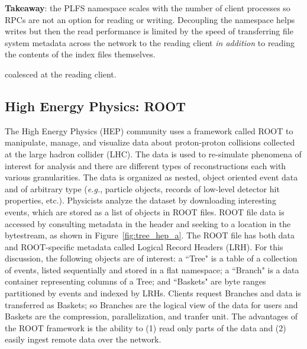 \textbf{Takeaway}: the PLFS namespace scales with the number of client
processes so RPCs are not an option for reading or writing.  Decoupling the
namespace helps writes but then the read performance is limited by the speed of
transferring file system metadata across the network to the reading client {\it
in addition} to reading the contents of the index files themselves.

coalesced at the reading client.

\vspace{-0.5em}
\subsection{High Energy Physics: ROOT}
\label{sec:hep}
\vspace{-0.5em}

The High Energy Physics (HEP) community uses a framework called ROOT to
manipulate, manage, and visualize data about proton-proton collisions collected
at the large hadron collider (LHC). The data is used to re-simulate phenomena
of interest for analysis and there are different types of reconstructions each
with various granularities. The data is organized as nested, object oriented
event data and of arbitrary type ({\it e.g.}, particle objects, records of
low-level detector hit properties, etc.).  Physicists analyze the dataset by
downloading interesting events, which are stored as a list of objects in ROOT
files.  ROOT file data is accessed by consulting metadata in the header and
seeking to a location in the bytestream, as shown in
Figure~\ref{fig:tree_hep_a}.  The ROOT file has both data and ROOT-specific
metadata called Logical Record Headers (LRH).  For this discussion, the
following objects are of interest: a ``Tree" is a table of a collection of
events, listed sequentially and stored in a flat namespace; a ``Branch" is a
data container representing columns of a Tree; and ``Baskets" are byte ranges
partitioned by events and indexed by LRHs.  Clients request Branches and data
is transferred as Baskets; so Branches are the logical view of the data for
users and Baskets are the compression, parallelization, and tranfer unit.  The
advantages of the ROOT framework is the ability to (1) read only parts of the
data and (2) easily ingest remote data over the network.  



